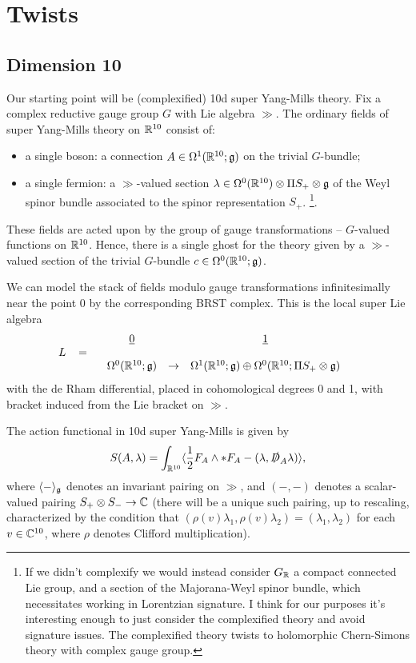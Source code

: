 \documentclass[10pt, oneside]{article}
\begin{document}
\section{Twists}

\subsection{Dimension 10}

Our starting point will be (complexified) 10d super Yang-Mills theory.  
Fix a complex reductive gauge group $G$ with Lie algebra $\gg$.  
The ordinary fields of super Yang-Mills theory on $\mathbb R^{10}$ consist of:
\begin{itemize}
\item a single boson: a connection $A \in \Omega^1(\mathbb R^{10} ; \mathfrak g)$ on the trivial $G$-bundle;
\item a single fermion: a $\gg$-valued section $\lambda \in \Omega^0(\mathbb R^{10}) \otimes \Pi S_+ \otimes \mathfrak g$ of the Weyl spinor bundle associated to the spinor representation $S_+$. 
\footnote{If we didn't complexify we would instead consider $G_\mathbb R$ a compact connected Lie group, and a section of the Majorana-Weyl spinor bundle, which necessitates working in Lorentzian signature.  I think for our purposes it's interesting enough to just consider the complexified theory and avoid signature issues.  The complexified theory twists to holomorphic Chern-Simons theory with complex gauge group.}.  
\end{itemize}
These fields are acted upon by the group of gauge transformations -- $G$-valued functions on $\mathbb R^{10}$. 
Hence, there is a single ghost for the theory given by a $\gg$-valued section of the trivial $G$-bundle $c \in \Omega^0(\mathbb R^{10} ; \mathfrak g)$. 

We can model the stack of fields modulo gauge transformations infinitesimally near the point $0$ by the corresponding BRST complex.  This is the local super Lie algebra
\[
L \;\;\; = \begin{array}{ccccc}
& \underline{0} & & \underline{1} & \\ 
& & & & \\
& \Omega^0(\mathbb R^{10}; \mathfrak{g}) & \to & \Omega^1(\mathbb R^{10}; \mathfrak{g}) \oplus \Omega^0(\mathbb R^{10}; \Pi S_+ \otimes \mathfrak{g}) & 
\end{array}
\]
with the de Rham differential, placed in cohomological degrees 0 and 1, with bracket induced from the Lie bracket on $\gg$.

The action functional in 10d super Yang-Mills is given by
\[S(A,\lambda) = \int_{\mathbb R^{10}} \langle \frac{1}{2} F_A \wedge \ast F_A - (\lambda, \slashed{D}_A \lambda)\rangle,\]
where $\langle - \rangle_\mathfrak g$ denotes an invariant pairing on $\gg$, and $(-,-)$ denotes a scalar-valued pairing $S_+ \otimes S_- \to \mathbb C$ (there will be a unique such pairing, up to rescaling, characterized by the condition that $(\rho(v)\lambda_1,\rho(v)\lambda_2) = (\lambda_1,\lambda_2)$ for each $v \in \mathbb C^{10}$, where $\rho$ denotes Clifford multiplication). 
\end{document}
